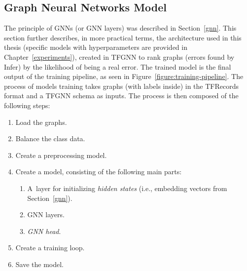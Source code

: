 \subsection{Graph Neural Networks Model}
\label{gnn-model}
The principle of GNNs (or GNN layers) was described in Section~\ref{gnn}. This section further describes, in more practical terms, the architecture used in this thesis (specific models with hyperparameters are provided in Chapter~\ref{experiments}), created in TFGNN to rank graphs (errors found by Infer) by the likelihood of being a real error. The trained model is the final output of the training pipeline, as seen in Figure~\ref{figure:training-pipeline}. The process of models training takes graphs (with labels inside) in the TFRecords format and a TFGNN schema as inputs. The process is then composed of the following steps:
\begin{enumerate}
    \item Load the graphs.
    \item Balance the class data.
    \item Create a preprocessing model.
    \item Create a model, consisting of the following main parts:
    \begin{enumerate}
        \item A~layer for initializing \textit{hidden states} (i.e., embedding vectors from Section~\ref{gnn}).
        \item GNN layers.
        \item \textit{GNN head}.
    \end{enumerate}
    \item Create a training loop.
    \item Save the model.
\end{enumerate}

